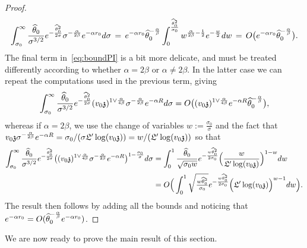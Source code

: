 \begin{proof}
\[\int_{\sigma_0}^\infty\frac{\widehat{\theta}_0}{\sigma^{3/2}}e^{-\frac{\widehat{\theta}_0^2}{2\sigma}}\sigma^{-\frac{\alpha}{2\beta}} e^{-\alpha r_0}d\sigma\,=\,e^{-\alpha r_0}\widehat{\theta}_0^{-\frac{\alpha}{\beta}}\int_0^{\frac{\widehat{\theta}_0^2}{\sigma_0}} w^{\frac{\alpha}{2\beta}-\frac{1}{2}}e^{-\frac{w}{2}}dw\,=\,O\big(e^{-\alpha r_0}\widehat{\theta}_0^{-\frac{\alpha}{\beta}}\big).\]
The final term in~\eqref{eq:boundPI} is a bit more delicate, and must be treated differently according to whether $\alpha= 2\beta$ or $\alpha\neq 2\beta$. In the latter case we can repeat the computations used in the previous term, giving
\[\int_{\sigma_0}^{\infty}\frac{\widehat{\theta}_0}{\sigma^{3/2}}e^{-\frac{\widehat{\theta}_0^2}{2\sigma}}(v_0\mathfrak{z})^{1\vee\frac{\alpha}{4\beta}}\sigma^{-\frac{\alpha}{2\beta}}e^{-\alpha R}d\sigma=O\big((v_0\mathfrak{z})^{1\vee\frac{\alpha}{4\beta}}e^{-\alpha R}\widehat{\theta}_0^{-\frac{\alpha}{\beta}}\big),\]
whereas if $\alpha=2\beta$, we use the change of variables $w:=\frac{\sigma_0}{\sigma}$ and the fact that $v_0\mathfrak{z}\sigma^{-\frac{\alpha}{2\beta}}e^{-\alpha R}
= \sigma_0/(\sigma\mathfrak{L}'\log(v_0\mathfrak{z}))=w/(\mathfrak{L}'\log(v_0\mathfrak{z}))$ so that
\begin{align*}\int_{\sigma_0}^{\infty}\frac{\widehat{\theta}_0}{\sigma^{3/2}}e^{-\frac{\widehat{\theta}_0^2}{2\sigma}}\big((v_0\mathfrak{z})^{1\vee\frac{\alpha}{4\beta}}\sigma^{-\frac{\alpha}{2\beta}}e^{-\alpha R}\big)^{1-\frac{\sigma_0}{\sigma}}d\sigma
&=\int_{0}^{1}\frac{\widehat{\theta}_0}{\sqrt{\sigma_0 w}}e^{-\frac{w\widehat{\theta}_0^2}{2\sigma_0}}\Big(\frac{w}{\mathfrak{L}'\log(v_0\mathfrak{z})}\Big)^{1-w}dw\\[2pt]
&=O\Big(\int_{0}^{1}\sqrt{\tfrac{w\widehat{\theta}_0^2}{\sigma_0}}e^{-\frac{w\widehat{\theta}_0^2}{2\sigma_0}}\Big(\mathfrak{L}'\log(v_0\mathfrak{z})\Big)^{w-1}dw\Big).\end{align*}
The result then follows by adding all the bounds and noticing that $e^{-\alpha r_0}=O(\widehat{\theta}_0^{-\frac{\alpha}{\beta}}e^{-\alpha r_0})$.
\end{proof}

We are now ready to prove the main result of this section.

